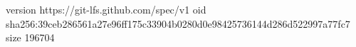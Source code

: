 version https://git-lfs.github.com/spec/v1
oid sha256:39ceb286561a27e96ff175c33904b0280d0e98425736144d286d522997a77fc7
size 196704
